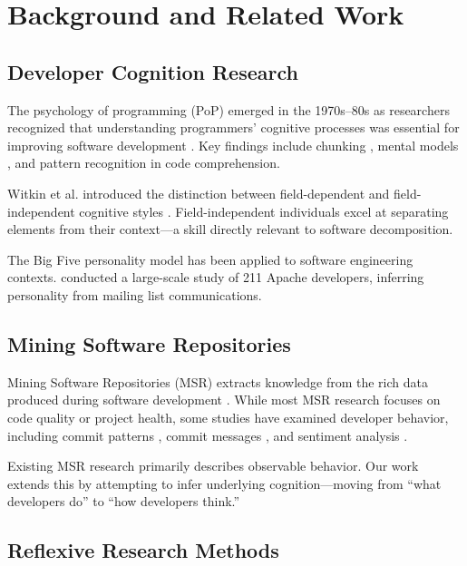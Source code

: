 \documentclass{ntlabs-preprint}
\begin{document}
\section{Background and Related Work}

\subsection{Developer Cognition Research}

The psychology of programming (PoP) emerged in the 1970s--80s as researchers recognized that understanding programmers' cognitive processes was essential for improving software development \citep{weinberg1971psychology, shneiderman1980software}. Key findings include chunking \citep{adelson1981problem}, mental models \citep{pennington1987stimulus}, and pattern recognition in code comprehension.

Witkin et al. introduced the distinction between field-dependent and field-independent cognitive styles \citep{witkin1977field}. Field-independent individuals excel at separating elements from their context---a skill directly relevant to software decomposition.

The Big Five personality model \citep{costa1992neo} has been applied to software engineering contexts. \citet{calefato2019personalities} conducted a large-scale study of 211 Apache developers, inferring personality from mailing list communications.

\subsection{Mining Software Repositories}

Mining Software Repositories (MSR) extracts knowledge from the rich data produced during software development \citep{hassan2008road}. While most MSR research focuses on code quality or project health, some studies have examined developer behavior, including commit patterns \citep{eyolfson2014correlations}, commit messages \citep{dyer2013boa}, and sentiment analysis \citep{guzman2014sentiment}.

Existing MSR research primarily describes observable behavior. Our work extends this by attempting to infer underlying cognition---moving from ``what developers do'' to ``how developers think.''

\subsection{Reflexive Research Methods}
\end{document}
